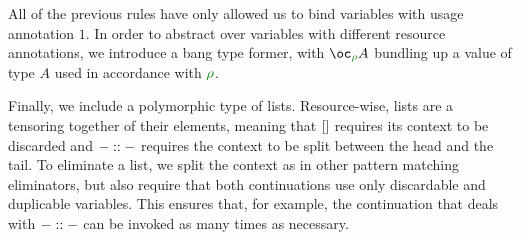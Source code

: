 
All of the previous rules have only allowed us to bind variables with usage
annotation $1$.
In order to abstract over variables with different resource annotations, we
introduce a bang type former, with $\excl{\rho}{A}$ bundling up a value of type
$A$ used in accordance with $\rescomment \rho$.


Finally, we include a polymorphic type of lists.
Resource-wise, lists are a tensoring together of their elements, meaning that
$[]$ requires its context to be discarded and $- :: -$ requires the
context to be split between the head and the tail.
To eliminate a list, we split the context as in other pattern matching
eliminators, but also require that both continuations use only discardable
and duplicable variables.
This ensures that, for example, the continuation that deals with $- :: -$
can be invoked as many times as necessary.

